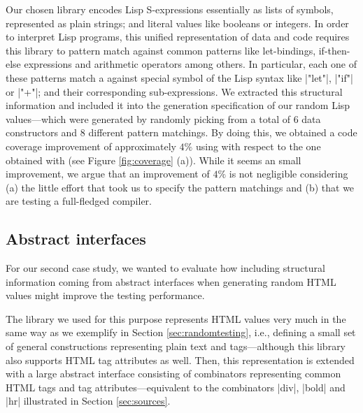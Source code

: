 Our chosen library encodes Lisp S-expressions essentially as lists of symbols,
represented as plain strings; and literal values like booleans or integers.
%
In order to interpret Lisp programs, this unified representation of data and
code requires this library to pattern match against common patterns like
let-bindings, if-then-else expressions and arithmetic operators among others.
%
In particular, each one of these patterns match a against special symbol of the
Lisp syntax like |"let"|, |"if"| or |"+"|; and their corresponding
sub-expressions.
%
We extracted this structural information and included it into the generation
specification of our random Lisp values---which were generated by randomly
picking from a total of 6 data constructors and 8 different pattern matchings.
%
By doing this, we obtained a code coverage improvement of approximately $4\%$
using \dragenp with respect to the one obtained with \dragen (see Figure
\ref{fig:coverage} (a)).
%
While it seems an small improvement, we argue that an improvement of $4\%$ is
not negligible considering (a) the little effort that took us to specify the
pattern matchings and (b) that we are testing a full-fledged compiler.
%

\subsection{Abstract interfaces}


For our second case study, we wanted to evaluate how including structural
information coming from abstract interfaces when generating random HTML values
might improve the testing performance.


The library we used for this purpose represents HTML values very much in the
same way as we exemplify in Section \ref{sec:randomtesting}, i.e., defining a
small set of general constructions representing plain text and tags---although
this library also supports HTML tag attributes as well.
%
Then, this representation is extended with a large abstract interface consisting
of combinators representing common HTML tags and tag attributes---equivalent to
the combinators |div|, |bold| and |hr| illustrated in Section \ref{sec:sources}.


